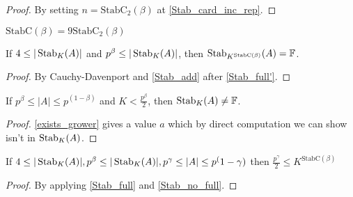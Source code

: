 \begin{proof}
    \leanok
    By setting $n = \mathrm{StabC}_2(\beta)$ at \ref{Stab_card_inc_rep}.
\end{proof}

\begin{definition}
    \label{StabC}
    \leakok
    $\mathrm{StabC}(\beta) = 9 \mathrm{StabC}_2(\beta)$
\end{definition}

\begin{lemma}
    \label{Stab_full}
    \leanok
    If $4 \leq |\operatorname{\operatorname{Stab}}_K(A)|$ and $p^\beta \leq |\operatorname{\operatorname{Stab}}_K(A)|$,
    then $\operatorname{\operatorname{Stab}}_{K^{\mathrm{StabC}(\beta)}} (A) = \mathbb{F}$.
\end{lemma}

\begin{proof}
    \leanok
    By Cauchy-Davenport and \ref{Stab_add} after \ref{Stab_full'}.
\end{proof}

\begin{lemma}
    \label{Stab_no_full}
    \leanok
    If $p^\beta \leq |A| \leq p^(1 - \beta)$ and $K < \frac{p^\beta}2$, then
    $\operatorname{\operatorname{Stab}}_K(A) \neq \mathbb{F}$.
\end{lemma}

\begin{proof}
    \leanok
    \ref{exists_grower} gives a value $a$ which by direct computation we can show isn't in $\operatorname{\operatorname{Stab}}_K(A)$.
\end{proof}

\begin{lemma}
    \label{Stab_small}
    \leanok
    If $4 \leq |\operatorname{\operatorname{Stab}}_K(A)|, p^\beta \leq |\operatorname{\operatorname{Stab}}_K(A)|, p^\gamma \leq |A| \leq p^(1 - \gamma)$
    then $\frac{p^\gamma}2 \leq K^{\mathrm{StabC}(\beta)}$
\end{lemma}

\begin{proof}
    \leanok
    By applying \ref{Stab_full} and \ref{Stab_no_full}.
\end{proof}